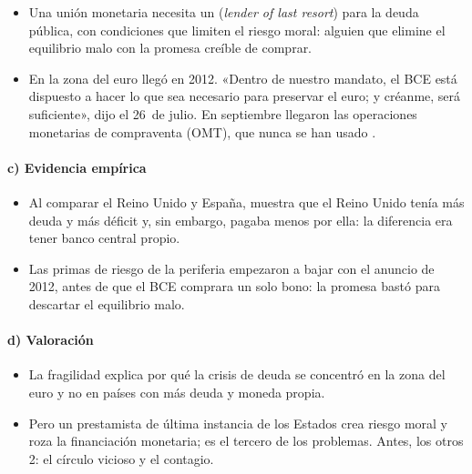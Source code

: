 \documentclass[11pt]{article}
\begin{document}
\begin{itemize}
\item Una unión monetaria necesita un  (\emph{lender of last resort}) para la deuda pública, con condiciones que limiten el riesgo moral: alguien que elimine el equilibrio malo con la promesa creíble de comprar.
\item En la zona del euro llegó en 2012. «Dentro de nuestro mandato, el BCE está dispuesto a hacer lo que sea necesario para preservar el euro; y créanme, será suficiente», dijo  el 26~de julio\nocite{Draghi2012Speech}. En septiembre llegaron las operaciones monetarias de compraventa (OMT), que nunca se han usado\nocite{BCE2012OMT} .
\end{itemize}

\paragraph{c) Evidencia empírica}

\begin{itemize}
\item Al comparar el Reino Unido y España, \textcite{DeGrauwe2011Governance} muestra que el Reino Unido tenía más deuda y más déficit y, sin embargo, pagaba menos por ella: la diferencia era tener banco central propio.
\item Las primas de riesgo de la periferia empezaron a bajar con el anuncio de 2012, antes de que el BCE comprara un solo bono: la promesa bastó para descartar el equilibrio malo\nocite{DeGrauwe2022Economics}.
\end{itemize}

\paragraph{d) Valoración}

\begin{itemize}
\item La fragilidad explica por qué la crisis de deuda se concentró en la zona del euro y no en países con más deuda y moneda propia.
\item Pero un prestamista de última instancia de los Estados crea riesgo moral y roza la financiación monetaria; es el tercero de los problemas. Antes, los otros 2: el círculo vicioso y el contagio.
\end{itemize}

\end{document}
